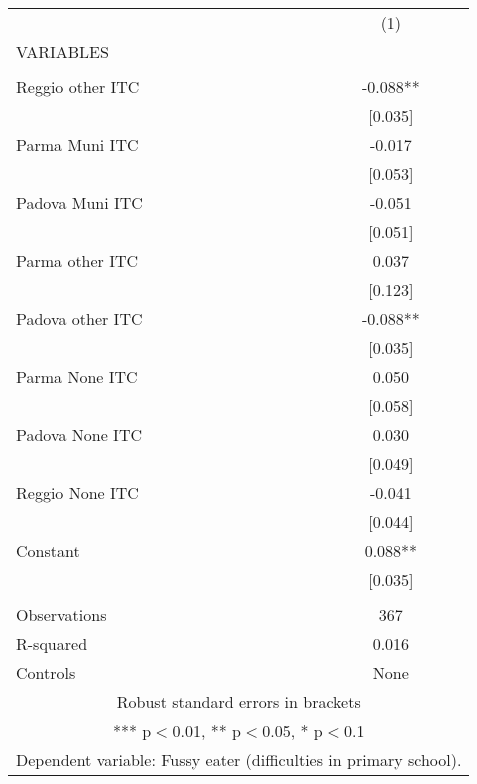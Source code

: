 \begin{tabular}{lc} \hline
 & (1) \\
VARIABLES &  \\ \hline
 &  \\
Reggio other ITC & -0.088** \\
 & [0.035] \\
Parma Muni ITC & -0.017 \\
 & [0.053] \\
Padova Muni ITC & -0.051 \\
 & [0.051] \\
Parma other ITC & 0.037 \\
 & [0.123] \\
Padova other ITC & -0.088** \\
 & [0.035] \\
Parma None ITC & 0.050 \\
 & [0.058] \\
Padova None ITC & 0.030 \\
 & [0.049] \\
Reggio None ITC & -0.041 \\
 & [0.044] \\
Constant & 0.088** \\
 & [0.035] \\
 &  \\
Observations & 367 \\
R-squared & 0.016 \\
 Controls & None \\ \hline
\multicolumn{2}{c}{ Robust standard errors in brackets} \\
\multicolumn{2}{c}{ *** p$<$0.01, ** p$<$0.05, * p$<$0.1} \\
\multicolumn{2}{c}{ Dependent variable: Fussy eater (difficulties in primary school).} \\
\end{tabular}
